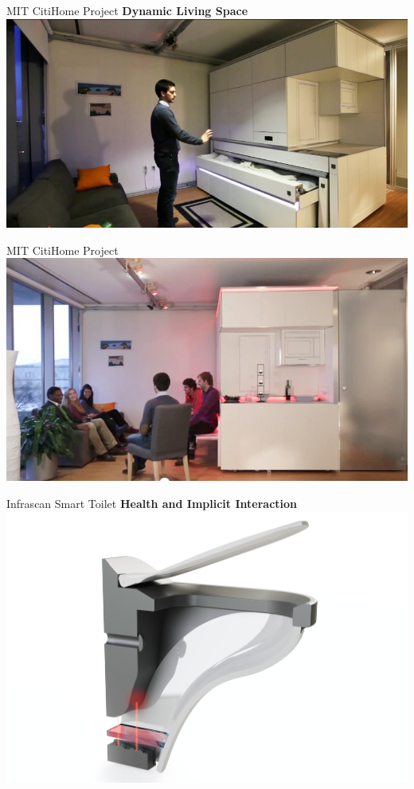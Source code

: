 \documentclass[10pt]{beamer}
\begin{document}
\begin{frame}{MIT CitiHome Project}
	\textbf{Dynamic Living Space}\\
	\vspace{3mm}
	\includegraphics[width=\textwidth]{images/4.jpg}
\end{frame}

\begin{frame}{MIT CitiHome Project}
\includegraphics[width=\textwidth]{images/5.jpg}
\end{frame}

\begin{frame}{Infrascan Smart Toilet}
	\textbf{Health and Implicit Interaction}\\
	\vspace{3mm}
	\includegraphics[width=\textwidth]{images/2.jpg}
\end{frame}
\end{document}
